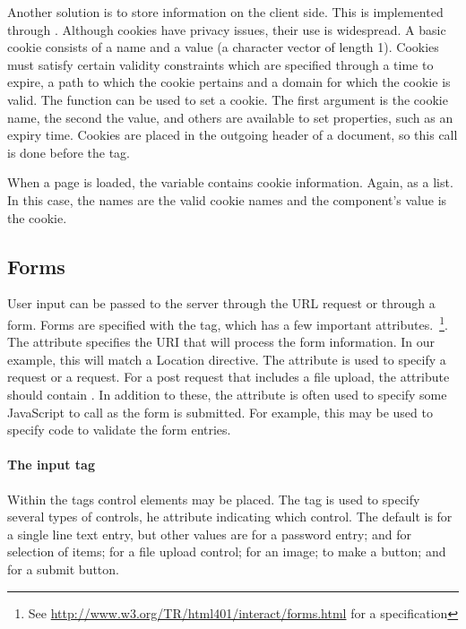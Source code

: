 Another solution is to store information on the client side. This is
implemented through . Although cookies have privacy
issues, their use is widespread.  A basic cookie consists of a name
and a value (a character vector of length 1).  Cookies must satisfy
certain validity constraints which are specified through a time to
expire, a path to which the cookie pertains and a domain for which the
cookie is valid. The  function  can
be used to set a cookie. The first argument is the cookie name, the
second the value, and others are available to set properties, such as
an expiry time. Cookies are placed in the outgoing header of a
document, so this call is done before the  tag.

When a page is loaded, the  variable contains cookie
information. Again, as a list. In this case, the names are the valid
cookie names and the component's value is the cookie.


\subsection{Forms}
\label{sec:forms}

User input can be passed to the server through the URL request or
through a form. Forms are specified with the  tag, which
has a few important attributes.~\footnote{See
  \url{http://www.w3.org/TR/html401/interact/forms.html} for a
  specification}. The  attribute specifies the URI that
will process the form information. In our example, this will match a
Location directive. The  attribute is used to specify a
 request or a  request. For a post request that
includes a file upload, the  attribute should contain
. In addition to these, the
 attribute is often used to specify some JavaScript to
call as the form is submitted. For example, this may be used to specify code to
validate the form entries.

\paragraph{The input tag}
Within the  tags control elements may be placed. The
 tag is used to specify several types of controls, he
 attribute indicating which control. The
default is  for a single line text entry, but other values are
 for a password entry;  and 
for selection of items;  for a file upload control;
 for an image;  to make a button; and
 for a submit button.

